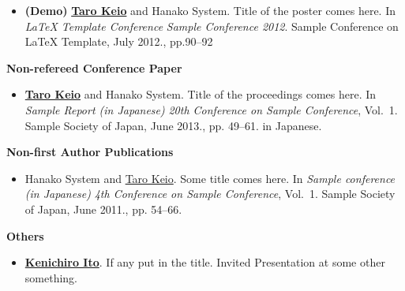 \begin{singlespace}
\begin{itemize}
    \item \textbf{(Demo)}
      \underline{\bfseries Taro Keio} and Hanako System.
      \newblock Title of the poster comes here.
      \newblock In {\em LaTeX Template Conference} {\em Sample Conference 2012}. Sample Conference on LaTeX Template, July 2012., pp.90--92
  \end{itemize}

  \begin{center}
    \textbf{Non-refereed Conference Paper}
  \end{center}
  \begin{itemize}
    \item
      \underline{\bfseries Taro Keio} and Hanako System.
      \newblock Title of the proceedings comes here.
      \newblock In {\em Sample Report (in Japanese)} {\em 20th Conference on Sample Conference}, Vol.~1. Sample Society of Japan, June 2013., pp. 49--61.
      \newblock in Japanese.

  \end{itemize}

  \begin{center}
    \textbf{Non-first Author Publications}
  \end{center}
  \begin{itemize}
    \item
      Hanako System and \underline{Taro Keio}.
      \newblock Some title comes here.
      \newblock In {\em Sample conference (in Japanese)} {\em 4th Conference on Sample Conference}, Vol.~1. Sample Society of Japan, June 2011., pp. 54--66.
      
  \end{itemize}

  \begin{center}
    \textbf{Others}
  \end{center}
  \begin{itemize}
    \item
      \underline{\bfseries Kenichiro Ito}.
      \newblock If any put in the title.
      \newblock Invited Presentation at some other something.

  \end{itemize}
\end{singlespace}
